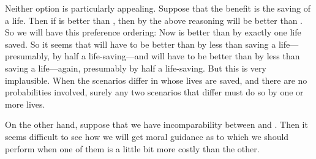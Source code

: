 Neither option is particularly appealing. Suppose that the benefit is the saving of a life. Then if
 is better than , then by the above reasoning 
will be better than . So we will have this preference ordering:
Now  is better than  by exactly one life saved. So it seems that
 will have to be better than  by less than saving a life---presumably,
by half a life-saving---and  will have to be better than  by less than saving 
a life---again, presumably by half a life-saving. But this is very implausible. When the scenarios differ in 
whose lives are saved, and there are no probabilities involved, surely any two scenarios that differ must do 
so by one or more lives. 

On the other hand, suppose that we have incomparability between  and .
Then it seems difficult to see how we will get moral guidance as to which we should perform when one of them
is a little bit more costly than the other. 


